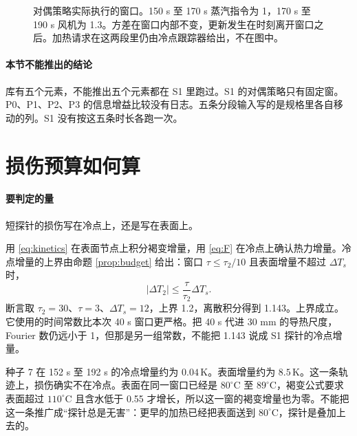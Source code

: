 \begin{figure}[ht]
\centering
{}
\caption{对偶策略实际执行的窗口。150 s 至 170 s 蒸汽指令为 1，170 s 至 190 s 风机为 1.3。方差在窗口内部不变，更新发生在时刻离开窗口之后。加热请求在这两段里仍由冷点跟踪器给出，不在图中。}
\end{figure}

\paragraph{本节不能推出的结论}
库有五个元素，不能推出五个元素都在 S1 里跑过。S1 的对偶策略只有固定窗。P0、P1、P2、P3 的信息增益比较没有日志。五条分段输入写的是规格里各自移动的列。S1 没有按这五条时长各跑一次。

\section{损伤预算如何算}

\paragraph{要判定的量}
短探针的损伤写在冷点上，还是写在表面上。

用 \eqref{eq:kinetics} 在表面节点上积分褐变增量，用 \eqref{eq:F} 在冷点上确认热力增量。冷点增量的上界由命题 \ref{prop:budget} 给出：窗口 \(\tau\le\tau_2/10\) 且表面增量不超过 \(\Delta T_s\) 时，
\begin{equation}
|\Delta T_2|\le \frac{\tau}{\tau_2}\Delta T_s.
\end{equation}
断言取 \(\tau_2=30\)、\(\tau=3\)、\(\Delta T_s=12\)，上界 1.2，离散积分得到 1.143。上界成立。它使用的时间常数比本次 40 s 窗口更严格。把 40 s 代进 30 mm 的导热尺度，Fourier 数仍远小于 1，但那是另一组常数，不能把 1.143 说成 S1 探针的冷点增量。

种子 7 在 152 s 至 192 s 的冷点增量约为 \(0.04\,\mathrm{K}\)。表面增量约为 \(8.5\,\mathrm{K}\)。这一条轨迹上，损伤确实不在冷点。表面在同一窗口已经是 \(80^\circ\mathrm{C}\) 至 \(89^\circ\mathrm{C}\)，褐变公式要求表面超过 \(110^\circ\mathrm{C}\) 且含水低于 0.55 才增长，所以这一窗的褐变增量也为零。不能把这一条推广成“探针总是无害”：更早的加热已经把表面送到 \(80^\circ\mathrm{C}\)，探针是叠加上去的。

